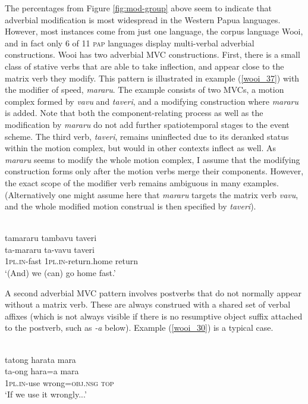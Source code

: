 The percentages from Figure \ref{fig:mod-group} above seem to indicate that adverbial modification is most widespread in the Western Papua languages. However, most instances come from just one language, the corpus language Wooi, and in fact only 6 of 11 \textsc{pap} languages display multi-verbal adverbial constructions. Wooi has two adverbial MVC constructions. First, there is a small class of stative verbs that are able to take inflection, and appear close to the matrix verb they modify. This pattern is illustrated in example (\ref{wooi_37}) with the modifier of speed, \textit{mararu}. The example consists of two MVCs, a motion complex formed by \textit{vavu} and \textit{taveri}, and a modifying construction where \textit{mararu} is added. Note that both the component-relating process as well as the modification by \textit{mararu} do not add further spatiotemporal stages to the event scheme. The third verb, \textit{taveri}, remains uninflected due to its deranked status within the motion complex, but would in other contexts inflect as well. As \textit{mararu} seems to modify the whole motion complex, I assume that the modifying construction forms only after the motion verbs merge their components. However, the exact scope of the modifier verb remains ambiguous in many examples. (Alternatively one might assume here that \textit{mararu} targets the matrix verb \textit{vavu}, and the whole modified motion construal is then specified by \textit{taveri}).

\ea \label{wooi_37}
\\
\glll tamararu tambavu taveri \\
ta-mararu ta-vavu taveri \\
1\textsc{pl}.\textsc{in}-fast 1\textsc{pl}.\textsc{in}-return.home return \\
\glft `(And) we (can) go home fast.'\\ 
\z

A second adverbial MVC pattern involves postverbs that do not normally appear without a matrix verb. These are always construed with a shared set of verbal affixes (which is not always visible if there is no resumptive object suffix attached to the postverb, such as \textit{-a} below). Example (\ref{wooi_30}) is a typical case.

\ea \label{wooi_30}
\\
\glll tatong harata mara \\
ta-ong hara=a mara \\
1\textsc{pl}.\textsc{in}-use wrong=\textsc{obj}.\textsc{nsg} \textsc{top} \\
\glft `If we use it wrongly...'\\ 
\z

